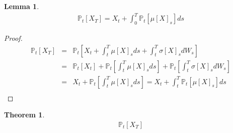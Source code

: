 \documentclass{article}
\newtheorem{thm}{Theorem}
\newtheorem{lem}{Lemma}
\newcommand{\bra}[1]{\left[#1\right]}
\renewcommand{\P}[1]{\mathbb{P}_t\bra{#1}}
\newcommand{\mub}[1]{\mu\bra{#1}}
\newcommand{\sigmab}[1]{\sigma\bra{#1}}
\begin{document}
\begin{lem}
  \begin{eqnarray*}
    \P{X_T} = X_t + \int_0^T\P{\mub{X}_s}ds
  \end{eqnarray*}
\end{lem}
\begin{proof}
  \begin{eqnarray*}
    \P{X_T} & = & \P{X_t + \int_t^T \mub{X}_s ds + \int_t^T\sigmab{X}_s dW_s}\\
    & = & \P{X_t} + \P{\int_t^T \mub{X}_s ds} + \P{\int_t^T\sigmab{X}_s dW_s}\\
    & = & X_t + \P{\int_t^T \mub{X}_s ds} = X_t + \int_t^T \P{\mub{X}_s} ds\\
  \end{eqnarray*}
\end{proof}

\begin{thm}
  \begin{eqnarray*}
    \P{X_T}
  \end{eqnarray*}
\end{thm}
\end{document}
